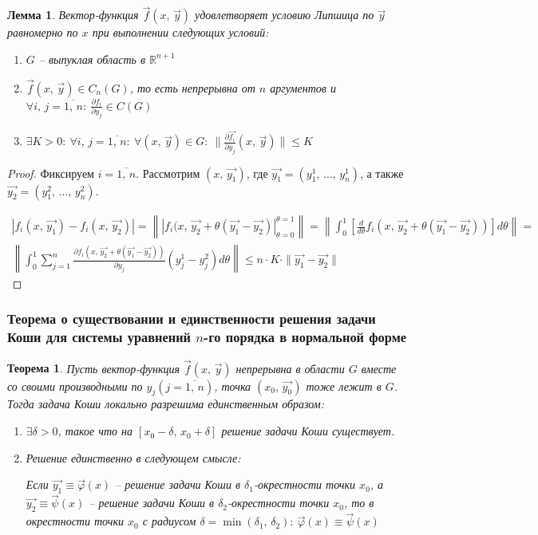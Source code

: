 \documentclass[a4paper,12pt]{article}
\renewcommand{\phi}{\ensuremath{\varphi}}
\renewcommand{\leq}{\ensuremath{\leqslant}}
\theoremstyle{plain}
\newtheorem{theorem}{Теорема}[section]
\newtheorem{lemma}{Лемма}[section]
\theoremstyle{definition}
\theoremstyle{remark}
\begin{document}
\begin{lemma}
	Вектор-функция $\vec{f}(x,\,\vec{y})$ удовлетворяет условию Липшица по $\vec{y}$ равномерно по $x$ при выполнении следующих условий:

	\begin{enumerate}
		\item $G$ -- выпуклая область в $\mathbb{R}^{n + 1}$
		\item $\vec{f}(x,\,\vec{y}) \in C_n(G)$, то есть непрерывна от $n$ аргументов и $\forall i,\, j = \overline{1,\,n}:\: \frac{\partial f_i}{\partial y_j} \in C(G)$
		\item $\exists K > 0:\: \forall i,\,j = \overline{1,\,n}:\: \forall (x,\, \vec{y}) \in G:\: \|\frac{\partial \vec{f_i}}{\partial y_j}(x,\,\vec{y})\| \leq K$
	\end{enumerate}
\end{lemma}

\begin{proof}
	Фиксируем $i = \overline{1,\,n}$. Рассмотрим $(x,\, \vec{y_1})$, где $\vec{y_1} = (y_1^1,\,\ldots,\,y_n^1)$, а также $\vec{y_2} = (y_1^2,\,\ldots,\,y_n^2)$.

	\begin{align*}
		|f_i(x,\,\vec{y_1}) - f_i(x,\,\vec{y_2})| = \left\lVert|f_i(x,\, \vec{y_2} + \theta(\vec{y_1} - \vec{y_2})|_{\theta = 0}^{\theta = 1}\right\rVert = \left\lVert\int_0^1 \left[\frac{d}{d\theta}f_i(x,\,\vec{y_2} + \theta(\vec{y_1} - \vec{y_2}))\right]d\theta\right\rVert = \\
		\left\lVert\int_0^1 \sum_{j = 1}^n \frac{\partial f_i(x,\, \vec{y_2} + \theta(\vec{y_1} - \vec{y_2}))}{\partial y_j}(y^1_j - y^2_j)d\theta\right\rVert \leq n \cdot K \cdot \|\vec{y_1} - \vec{y_2}\|
	\end{align*}
\end{proof}

\subsubsection*{Теорема о существовании и единственности решения задачи Коши для системы уравнений $n$-го порядка в нормальной форме}

\begin{theorem}
	Пусть вектор-функция $\vec{f}(x,\, \vec{y})$ непрерывна в области $G$ вместе со своими производными по $y_j (j = \overline{1,\,n})$, точка $(x_0,\, \vec{y_0})$ тоже лежит в $G$. Тогда задача Коши локально разрешима единственным образом:
	\begin{enumerate}
		\item $\exists \delta > 0$, такое что на $[x_0 - \delta,\, x_0 + \delta]$ решение задачи Коши существует.
		\item Решение единственно в следующем смысле:

		      Если $\vec{y_1} \equiv \vec{\phi}(x)$ -- решение задачи Коши в $\delta_1$-окрестности точки $x_0$, а $\vec{y_2} \equiv \vec{\psi}(x)$ -- решение задачи Коши в $\delta_2$-окрестности точки $x_0$, то в окрестности точки $x_0$ с радиусом $\delta = \min(\delta_1,\,\delta_2):\: \vec{\phi}(x) \equiv \vec{\psi}(x)$
	\end{enumerate}
\end{theorem}
\end{document}
